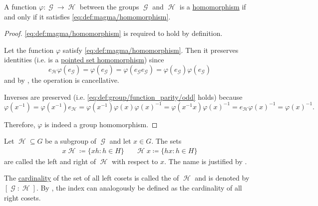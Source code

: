 \begin{proposition}\label{thm:group_homomorphism_single_condition}
  A function \( \varphi: \mscrG \to \mscrH \) between the groups \( \mscrG \) and \( \mscrH \) is a \hyperref[def:group/homomorphism]{homomorphism} if and only if it satisfies \eqref{eq:def:magma/homomorphism}.
\end{proposition}
\begin{proof}
  \SufficiencySubProof \eqref{eq:def:magma/homomorphism} is required to hold by definition.

  \NecessitySubProof Let the function \( \varphi \) satisfy \eqref{eq:def:magma/homomorphism}. Then it preserves identities (i.e. is a \hyperref[def:pointed_set/homomorphism]{pointed set homomorphism}) since
  \begin{equation*}
    e_{\mscrH} \varphi(e_{\mscrG}) = \varphi(e_{\mscrG}) = \varphi(e_{\mscrG} e_{\mscrG}) = \varphi(e_{\mscrG}) \varphi(e_{\mscrG})
  \end{equation*}
  and by , the operation is cancellative.

  Inverses are preserved (i.e. \eqref{eq:def:group/function_parity/odd} holds) because
  \begin{equation*}
    \varphi(x^{-1})
    =
    \varphi(x^{-1}) e_{\mscrH}
    =
    \varphi(x^{-1}) \varphi(x) \varphi(x)^{-1}
    =
    \varphi(x^{-1} x) \varphi(x)^{-1}
    =
    e_{\mscrH} \varphi(x)^{-1}
    =
    \varphi(x)^{-1}.
  \end{equation*}

  Therefore, \( \varphi \) is indeed a group homomorphism.
\end{proof}

\begin{definition}\label{def:group_cosets}
  Let \( \mscrH \subseteq G \) be a subgroup of \( \mscrG \) and let \( x \in G \). The sets
  \begin{align*}
    x \mscrH \coloneqq \{ xh \colon h \in H \}
    &&
    \mscrH x \coloneqq \{ hx \colon h \in H \}
  \end{align*}
  are called the left and right  of \( \mscrH \) with respect to \( x \). The name is justified by .

  The \hyperref[def:cardinal]{cardinality} of the set of all left cosets is called the  of \( \mscrH \) and is denoted by \( [\mscrG : \mscrH] \). By , the index can analogously be defined as the cardinality of all right cosets.
\end{definition}

